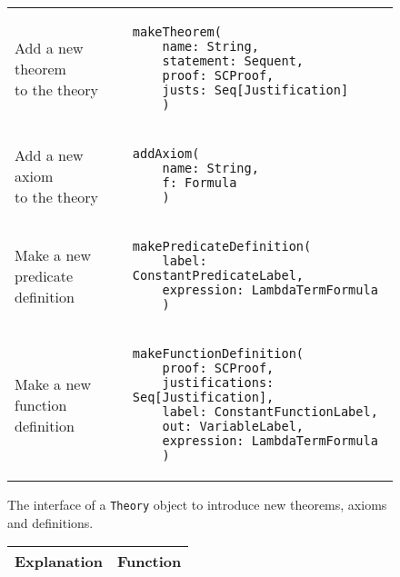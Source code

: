 {\begin{figure}[hp]
\begin{center}
\begin{tabular}{l|l}
          \makecell[l]{Add a new theorem \\to the theory} &
          \begin{lstlisting}[linewidth=19.5em]
  makeTheorem(
    name: String,
    statement: Sequent,
    proof: SCProof,
    justs: Seq[Justification]
    )
          \end{lstlisting}
          \\ %

          \makecell[l]{Add a new axiom   \\ to the theory} &
          \begin{lstlisting}[linewidth=19.5em]
  addAxiom(
    name: String,
    f: Formula
    )
          \end{lstlisting}
          \\ %

          \makecell[l]{Make a new        \\predicate definition} &
          \begin{lstlisting}[linewidth=19.5em]
  makePredicateDefinition(
    label: ConstantPredicateLabel,
    expression: LambdaTermFormula
    )
          \end{lstlisting}
          \\ %

          \makecell[l]{Make a new        \\function definition} &
          \begin{lstlisting}[linewidth=19.5em]
  makeFunctionDefinition(
    proof: SCProof,
    justifications: Seq[Justification],
    label: ConstantFunctionLabel,
    out: VariableLabel,
    expression: LambdaTermFormula
    )
          \end{lstlisting}
          \\ %
        \end{tabular}
        \caption{The interface of a \lstinline|Theory|{} object to introduce new theorems, axioms and definitions.}

        \label{fig:theorysetters}
      \end{center}
    \end{figure}







    \iffalse
      \begin{figure}[hp]
        \begin{center}
          \begin{tabular}{l|l}
            Explanation & Function
            \\ \hline


\end{tabular}
\end{center}
\end{figure}}
